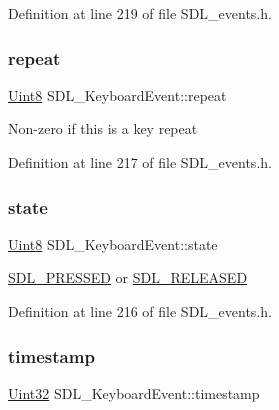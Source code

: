 Definition at line 219 of file S\+D\+L\+\_\+events.\+h.

\mbox{\label{struct_s_d_l___keyboard_event_a3edac3b36304812d533795c9df4ed4c1}} 
\subsubsection{\texorpdfstring{repeat}{repeat}}
{\footnotesize\ttfamily \mbox{\hyperlink{_s_d_l__stdinc_8h_a2944638813a090aa23e62f4da842c3e2}{Uint8}} S\+D\+L\+\_\+\+Keyboard\+Event\+::repeat}

Non-\/zero if this is a key repeat 

Definition at line 217 of file S\+D\+L\+\_\+events.\+h.

\mbox{\label{struct_s_d_l___keyboard_event_a110558eb96c113c86cfa31a7018c2346}} 
\subsubsection{\texorpdfstring{state}{state}}
{\footnotesize\ttfamily \mbox{\hyperlink{_s_d_l__stdinc_8h_a2944638813a090aa23e62f4da842c3e2}{Uint8}} S\+D\+L\+\_\+\+Keyboard\+Event\+::state}

\mbox{\hyperlink{_s_d_l__events_8h_aee81bbffbc8489bdea8fecd1232c4bd1}{S\+D\+L\+\_\+\+P\+R\+E\+S\+S\+ED}} or \mbox{\hyperlink{_s_d_l__events_8h_ad680a069f9fcab80de91b3eefdf29c3c}{S\+D\+L\+\_\+\+R\+E\+L\+E\+A\+S\+ED}} 

Definition at line 216 of file S\+D\+L\+\_\+events.\+h.

\mbox{\label{struct_s_d_l___keyboard_event_a3da1d8f6892e7f6ee28d9eafdb5e7d02}} 
\subsubsection{\texorpdfstring{timestamp}{timestamp}}
{\footnotesize\ttfamily \mbox{\hyperlink{_s_d_l__stdinc_8h_add440eff171ea5f55cb00c4a9ab8672d}{Uint32}} S\+D\+L\+\_\+\+Keyboard\+Event\+::timestamp}

